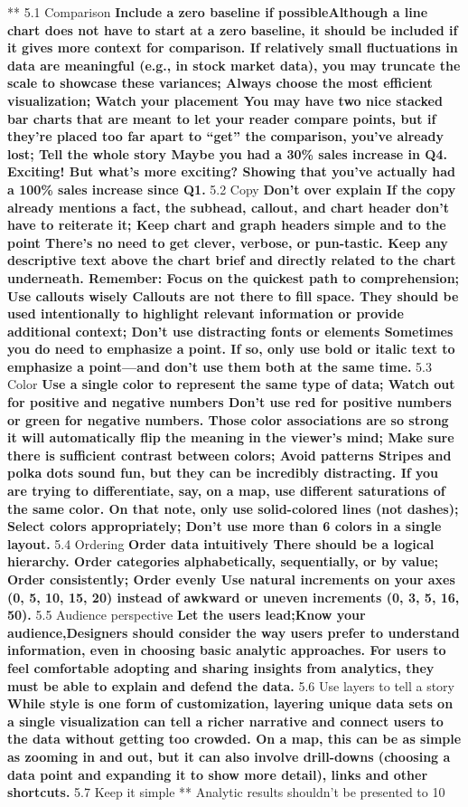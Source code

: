 \documentclass[]{book}
\theoremstyle{definition}
\theoremstyle{definition}
\theoremstyle{definition}
\theoremstyle{remark}
\begin{document}
** 5.1 Comparison \textbf{ Include a zero baseline if possibleAlthough a
line chart does not have to start at a zero baseline, it should be
included if it gives more context for comparison. If relatively small
fluctuations in data are meaningful (e.g., in stock market data), you
may truncate the scale to showcase these variances; Always choose the
most efficient visualization; Watch your placement You may have two nice
stacked bar charts that are meant to let your reader compare points, but
if they're placed too far apart to ``get'' the comparison, you've
already lost; Tell the whole story Maybe you had a 30\% sales increase
in Q4. Exciting! But what's more exciting? Showing that you've actually
had a 100\% sales increase since Q1. } 5.2 Copy \textbf{ Don't over
explain If the copy already mentions a fact, the subhead, callout, and
chart header don't have to reiterate it; Keep chart and graph headers
simple and to the point There's no need to get clever, verbose, or
pun-tastic. Keep any descriptive text above the chart brief and directly
related to the chart underneath. Remember: Focus on the quickest path to
comprehension; Use callouts wisely Callouts are not there to fill space.
They should be used intentionally to highlight relevant information or
provide additional context; Don't use distracting fonts or elements
Sometimes you do need to emphasize a point. If so, only use bold or
italic text to emphasize a point---and don't use them both at the same
time. } 5.3 Color \textbf{ Use a single color to represent the same type
of data; Watch out for positive and negative numbers Don't use red for
positive numbers or green for negative numbers. Those color associations
are so strong it will automatically flip the meaning in the viewer's
mind; Make sure there is sufficient contrast between colors; Avoid
patterns Stripes and polka dots sound fun, but they can be incredibly
distracting. If you are trying to differentiate, say, on a map, use
different saturations of the same color. On that note, only use
solid-colored lines (not dashes); Select colors appropriately; Don't use
more than 6 colors in a single layout. } 5.4 Ordering \textbf{ Order
data intuitively There should be a logical hierarchy. Order categories
alphabetically, sequentially, or by value; Order consistently; Order
evenly Use natural increments on your axes (0, 5, 10, 15, 20) instead of
awkward or uneven increments (0, 3, 5, 16, 50). } 5.5 Audience
perspective \textbf{ Let the users lead;Know your audience,Designers
should consider the way users prefer to understand information, even in
choosing basic analytic approaches. For users to feel comfortable
adopting and sharing insights from analytics, they must be able to
explain and defend the data. } 5.6 Use layers to tell a story \textbf{
While style is one form of customization, layering unique data sets on a
single visualization can tell a richer narrative and connect users to
the data without getting too crowded. On a map, this can be as simple as
zooming in and out, but it can also involve drill-downs (choosing a data
point and expanding it to show more detail), links and other shortcuts.
} 5.7 Keep it simple ** Analytic results shouldn't be presented to 10
\end{document}
